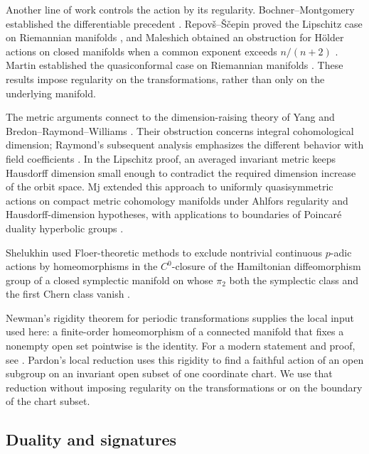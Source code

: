 Another line of work controls the action by its regularity.
Bochner--Montgomery established the differentiable precedent
\cite{BochnerMontgomery1946}.
Repov\v{s}--\v{S}\v{c}epin proved the Lipschitz case on Riemannian
manifolds \cite[Theorem~1.1]{RepovsScepin1997}, and Maleshich obtained
an obstruction for H\"older actions on closed manifolds when a common
exponent exceeds $n/(n+2)$ \cite[Theorem~3.1]{Maleshich1997}.
Martin established the quasiconformal case on Riemannian manifolds
\cite[Theorems~1.2--1.3]{Martin1999}.
These results impose regularity on the transformations, rather than only
on the underlying manifold.

The metric arguments connect to the dimension-raising theory of
Yang and Bredon--Raymond--Williams
\cite{Yang1960,BredonRaymondWilliams1961}.
Their obstruction concerns integral cohomological dimension;
Raymond's subsequent analysis emphasizes the different behavior with
field coefficients \cite{Raymond1961}.
In the Lipschitz proof, an averaged invariant metric keeps Hausdorff
dimension small enough to contradict the required dimension increase
of the orbit space.
Mj extended this approach to uniformly quasisymmetric actions on
compact metric cohomology manifolds under Ahlfors regularity and
Hausdorff-dimension hypotheses, with applications to boundaries of
Poincar\'e duality hyperbolic groups
\cite[Theorem~2.24 and Corollary~2.25]{Mj2012}.

Shelukhin used Floer-theoretic methods to exclude nontrivial continuous
$p$-adic actions by homeomorphisms in the $C^0$-closure of the Hamiltonian
diffeomorphism group of a closed symplectic manifold on whose $\pi_2$
both the symplectic class and the first Chern class vanish
\cite[Theorem~A]{Shelukhin2024}.

Newman's rigidity theorem for periodic transformations
\cite{Newman1931} supplies the local input used here: a finite-order
homeomorphism of a connected manifold that fixes a nonempty open set
pointwise is the identity. For a modern statement and proof, see
\cite[author manuscript, pp.~2--3]{Pardon2019}.
Pardon's local reduction \cite[\S4.1]{Pardon2013} uses this rigidity to
find a faithful action of an open subgroup on an invariant open subset
of one coordinate chart. We use that reduction without imposing
regularity on the transformations or on the boundary of the chart subset.

\subsection{Duality and signatures}

